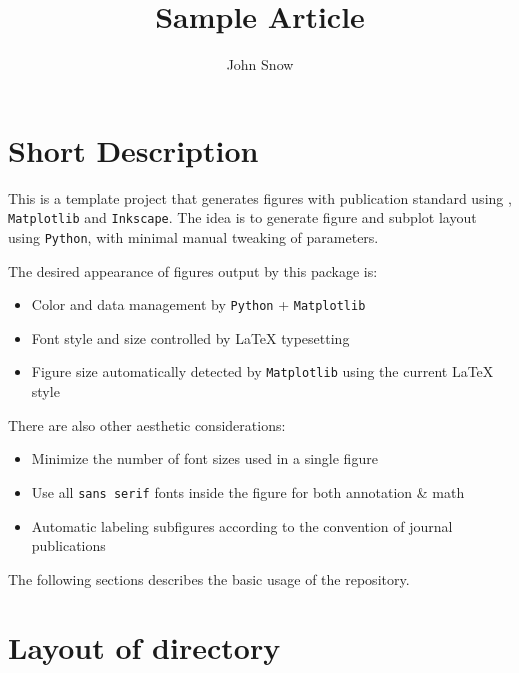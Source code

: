 


\usepackage{lua-visual-debug}


\title{Sample Article}
\author{John Snow}
\newcommand*{\mpl}{\texttt{Matplotlib}\xspace}
\newcommand*{\ink}{\texttt{Inkscape}\xspace}
\newcommand*{\py}{\texttt{Python}\xspace}


\maketitle

\doublespacing


\section{Short Description}
\label{sec:usage}

This is a template project that generates figures with publication
standard using \LaTeXe{}, \mpl and \ink. The idea is to generate
figure and subplot layout using \py, with minimal manual tweaking of
parameters.

The desired appearance of figures output by this package is:
\begin{itemize}
\item Color and data management by \py{} + \mpl{}
\item Font style and size controlled by \LaTeX{} typesetting
\item Figure size automatically detected by \mpl{} using the current \LaTeX{} style
\end{itemize}

There are also other aesthetic considerations:
\begin{itemize}
\item Minimize the number of font sizes used in a single figure
\item Use all \texttt{sans serif} fonts inside the figure for both annotation \& math
\item Automatic labeling subfigures according to the convention of journal publications
\end{itemize}

The following sections describes the basic usage of the repository. 

\section{Layout of directory}
\label{sec:layout-directory}

